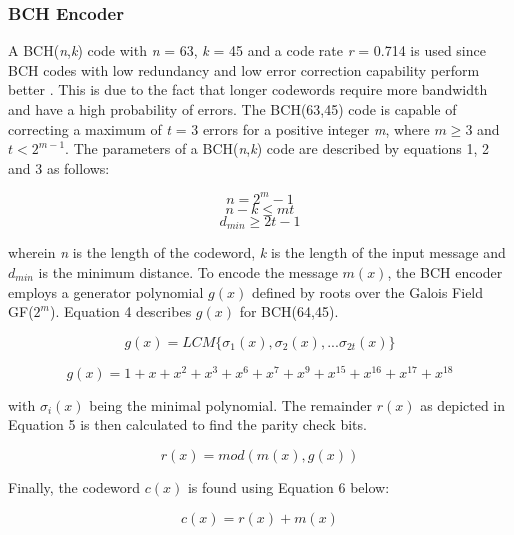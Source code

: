 \documentclass[pdftex,11pt,a4paper]{article}
\begin{document}
\subsubsection{BCH Encoder}
A BCH(\textit{n},\textit{k}) code with \textit{n} = 63, \textit{k} = 45 and a code rate \textit{r} = 0.714 is used since BCH codes with low redundancy and low error correction capability perform better \cite{14_7}. This is due to the fact that longer codewords require more bandwidth and have a high probability of errors. The BCH(63,45) code is capable of correcting a maximum of \textit{t} = 3 errors for a positive integer \textit{m}, where \(m\geq3\) and \(t<2^{m-1}\). The parameters of a BCH(\textit{n},\textit{k}) code are described by equations 1, 2 and 3 as follows:

\begin{equation}
	n = 2^{m}-1
\end{equation}
\begin{equation}
	n-k\leq mt
\end{equation}
\begin{equation}
	d_{min} \geq 2t -1
\end{equation}

wherein \textit{n} is the length of the codeword, \textit{k} is the length of the input message and \(d_{min}\) is the minimum distance. To encode the message \(m(x)\), the BCH encoder employs a generator polynomial \(g(x)\) defined by roots over the Galois Field GF($2^{m}$). Equation 4 describes \(g(x)\) for BCH(64,45).

\begin{equation} 
	g(x)= LCM\{\sigma_{1}(x),\sigma_{2}(x),... \sigma_{2t}(x)\}
\end{equation}

\begin{equation*} 
g(x)  =1 + x + x^2 + x^3 + x^6 + x^7 + x^9 + x^{15} + x^{16} + x^{17} + x^{18}
\end{equation*}

with \(\sigma_{i}(x)\) being the minimal polynomial. The remainder \(r(x)\) as depicted in Equation 5 is then calculated to find the parity check bits.

\begin{equation}
	r(x) = mod(m(x), g(x)) 
\end{equation}

Finally, the codeword \(c(x)\) is found using Equation 6 below:

\begin{equation}
	c(x) = r(x) + m(x)
\end{equation}
\end{document}

